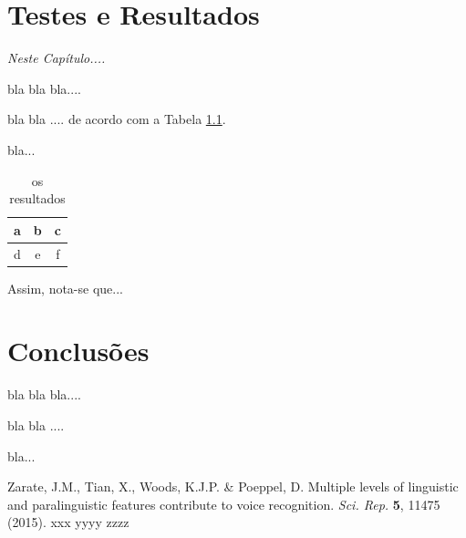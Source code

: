 \documentclass[a4paper,12pt,openright,oneside]{book}
\newenvironment{myenv}[1]
  {\begin{spacing}{#1}}
  {\end{spacing}}
\begin{document}
\chapter{Testes e Resultados}
\label{c_tr}
\textit{Neste Cap\'{i}tulo....}
\begin{myenv}{1.5}
\par bla bla bla....
\\
\par bla bla ....  de acordo com a Tabela \ref{t_res}.
\\
\par bla... 
\begin{table}
\centering
\caption{os resultados}
\vspace*{+10pt}
\begin{tabular}{|c|c|c|}
\hline
a & b & c \\
\hline
d & e & f \\
\hline
\end{tabular}
\label{t_res}
\end{table}
\par Assim, nota-se que... 
\end{myenv}
\chapter{Conclus\~{o}es}
\label{c_c}
\begin{myenv}{1.5}
\par bla bla bla....
\\
\par bla bla ....
\\
\par bla...
\end{myenv}
\begin{thebibliography}{1}
Zarate, J.M., Tian, X., Woods, K.J.P. \& Poeppel, D. Multiple levels of linguistic and paralinguistic features contribute to voice recognition. \textit{Sci. Rep.} \textbf{5}, 11475 (2015).
xxx yyyy zzzz
\end{thebibliography}
\end{document}
